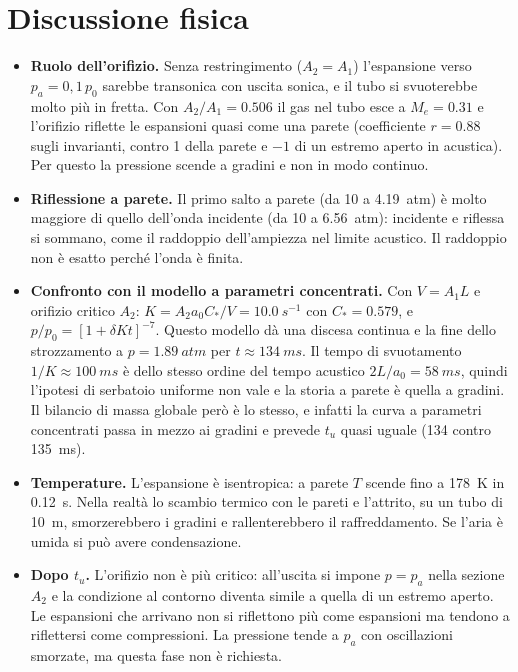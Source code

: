 \documentclass[11pt,a4paper]{article}
\begin{document}
\section{Discussione fisica}
\begin{itemize}
\item \textbf{Ruolo dell'orifizio.} Senza restringimento ($A_2=A_1$) l'espansione verso $p_a=0{,}1\,p_0$ sarebbe
  transonica con uscita sonica, e il tubo si svuoterebbe molto più in fretta. Con $A_2/A_1=\num{0.506}$ il
  gas nel tubo esce a $M_e=\num{0.31}$ e l'orifizio riflette le espansioni quasi come una parete (coefficiente
  $r=\num{0.88}$ sugli invarianti, contro 1 della parete e $-1$ di un estremo aperto in acustica). Per questo
  la pressione scende a gradini e non in modo continuo.
\item \textbf{Riflessione a parete.} Il primo salto a parete (da 10 a \SI{4.19}{atm}) è molto maggiore di
  quello dell'onda incidente (da 10 a \SI{6.56}{atm}): incidente e riflessa si sommano, come il raddoppio
  dell'ampiezza nel limite acustico. Il raddoppio non è esatto perché l'onda è finita.
\item \textbf{Confronto con il modello a parametri concentrati.} Con $V=A_1L$ e orifizio critico
  $A_2$: $K=A_2a_0C_*/V=\SI{10.0}{s^{-1}}$ con $C_*=\num{0.579}$, e
  $p/p_0=[1+\delta Kt]^{-7}$. Questo modello dà una discesa continua e la fine dello strozzamento a
  $p=\SI{1.89}{atm}$ per $t\approx\SI{134}{ms}$. Il tempo di svuotamento $1/K\approx\SI{100}{ms}$ è dello stesso
  ordine del tempo acustico $2L/a_0=\SI{58}{ms}$, quindi l'ipotesi di serbatoio uniforme non vale e la storia a
  parete è quella a gradini. Il bilancio di massa globale però è lo stesso, e infatti la curva a parametri
  concentrati passa in mezzo ai gradini e prevede $t_u$ quasi uguale (\num{134} contro \SI{135}{ms}).
\item \textbf{Temperature.} L'espansione è isentropica: a parete $T$ scende fino a \SI{178}{K} in \SI{0.12}{s}.
  Nella realtà lo scambio termico con le pareti e l'attrito, su un tubo di \SI{10}{m}, smorzerebbero i gradini e
  rallenterebbero il raffreddamento. Se l'aria è umida si può avere condensazione.
\item \textbf{Dopo $t_u$.} L'orifizio non è più critico: all'uscita si impone $p=p_a$ nella sezione $A_2$ e la
  condizione al contorno diventa simile a quella di un estremo aperto. Le espansioni che arrivano non si
  riflettono più come espansioni ma tendono a riflettersi come compressioni. La pressione tende a $p_a$ con
  oscillazioni smorzate, ma questa fase non è richiesta.
\end{itemize}
\end{document}
